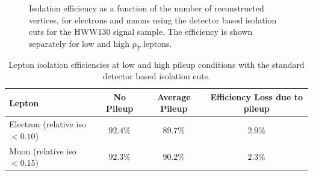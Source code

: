 \begin{figure}[!htbp]
\begin{center}
\caption{ Isolation efficiency as a function of the number of reconstructed vertices, for electrons and muons using 
the detector based isolation cuts for the HWW130 signal sample. The efficiency is shown separately for
low and high $p_{T}$ leptons.  }
\label{fig:StandardIsoEfficiency_vs_NVertices}
\end{center}
\end{figure}

\begin{table}[!htbp]
\begin{center}
\begin{tabular}{|l|c|c|c|}
\hline
	Lepton & No Pileup & Average Pileup & Efficiency Loss due to pileup\\
\hline
Electron (relative iso $< 0.10$) &  $92.4\%$ & $89.7\%$ & $2.9\%$ \\
Muon (relative iso $< 0.15$)    &  $92.3\%$ & $90.2\%$ & $2.3\%$ \\
\hline
\end{tabular}
\caption{Lepton isolation efficiencies at low and high pileup conditions with the standard
detector based isolation cuts. }
\label{tab:LeptonIsolationEfficiencyLossFromPileup}
\end{center}
\end{table}


